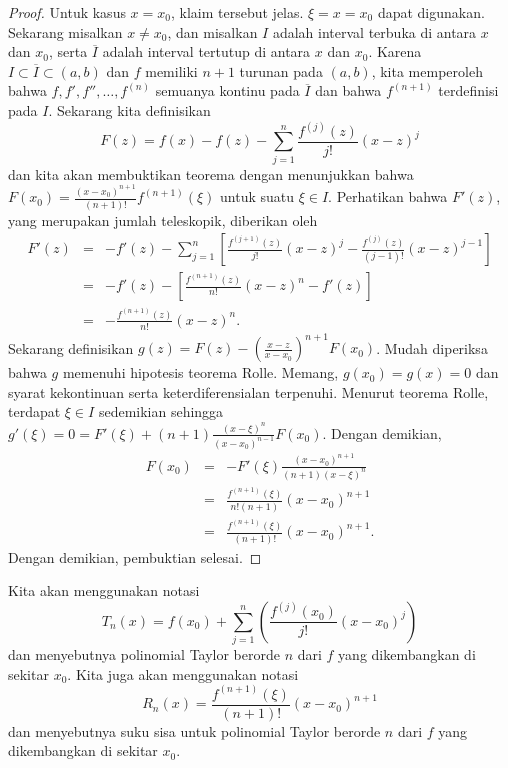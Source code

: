 \begin{proof}
\noindent Untuk kasus $x=x_{0}$, klaim tersebut jelas. $\xi=x=x_{0}$
dapat digunakan. Sekarang misalkan $x\neq x_{0}$, dan misalkan $I$
adalah interval terbuka di antara $x$ dan $x_{0}$, serta $\overline{I}$
adalah interval tertutup di antara $x$ dan $x_{0}$. Karena $I\subset\overline{I}\subset(a,b)$
dan $f$ memiliki $n+1$ turunan pada $(a,b)$, kita memperoleh bahwa
$f,f',f'',\ldots,f^{(n)}$ semuanya kontinu pada $\overline{I}$ dan
bahwa $f^{(n+1)}$ terdefinisi pada $I$. Sekarang kita definisikan
\[
F(z)=f(x)-f(z)-\sum_{j=1}^{n}\frac{f^{(j)}(z)}{j!}(x-z)^{j}
\]
dan kita akan membuktikan teorema dengan menunjukkan bahwa $F(x_{0})=\frac{(x-x_{0})^{n+1}}{(n+1)!}f^{(n+1)}(\xi)$
untuk suatu $\xi\in I$. Perhatikan bahwa $F'(z)$, yang merupakan
jumlah teleskopik, diberikan oleh
\begin{eqnarray*}
F'(z) & = & -f'(z)-\sum_{j=1}^{n}\left[\frac{f^{(j+1)}(z)}{j!}(x-z)^{j}-\frac{f^{(j)}(z)}{(j-1)!}(x-z)^{j-1}\right]\\
 & = & -f'(z)-\left[\frac{f^{(n+1)}(z)}{n!}(x-z)^{n}-f'(z)\right]\\
 & = & -\frac{f^{(n+1)}(z)}{n!}(x-z)^{n}.
\end{eqnarray*}
Sekarang definisikan $g(z)=F(z)-\left(\frac{x-z}{x-x_{0}}\right)^{n+1}F(x_{0})$.
Mudah diperiksa bahwa $g$ memenuhi hipotesis teorema Rolle. Memang,
$g(x_{0})=g(x)=0$ dan syarat kekontinuan serta keterdiferensialan
terpenuhi. Menurut teorema Rolle, terdapat $\xi\in I$ sedemikian
sehingga $g'(\xi)=0=F'(\xi)+(n+1)\frac{(x-\xi)^{n}}{(x-x_{0})^{n-1}}F(x_{0})$.
Dengan demikian, 
\begin{eqnarray*}
F(x_{0}) & = & -F'(\xi)\frac{(x-x_{0})^{n+1}}{(n+1)(x-\xi)^{n}}\\
 & = & \frac{f^{(n+1)}(\xi)}{n!(n+1)}(x-x_{0})^{n+1}\\
 & = & \frac{f^{(n+1)}(\xi)}{(n+1)!}(x-x_{0})^{n+1}.
\end{eqnarray*}
Dengan demikian, pembuktian selesai. 
\end{proof}
Kita akan menggunakan notasi 
\[
T_{n}(x)=f(x_{0})+\sum_{j=1}^{n}\left(\frac{f^{(j)}(x_{0})}{j!}(x-x_{0})^{j}\right)
\]
dan menyebutnya polinomial Taylor berorde $n$ 
 dari $f$ yang dikembangkan di sekitar
$x_{0}$. Kita juga akan menggunakan notasi 
\[
R_{n}(x)=\frac{f^{(n+1)}(\xi)}{(n+1)!}(x-x_{0})^{n+1}
\]
dan menyebutnya suku sisa  untuk polinomial
Taylor berorde $n$ dari $f$ yang dikembangkan di sekitar $x_{0}$. 

